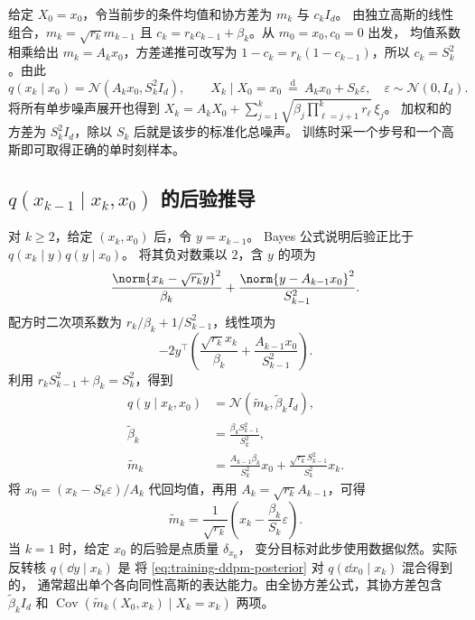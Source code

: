 给定 \(X_0=x_0\)，令当前步的条件均值和协方差为 \(m_k\) 与 \(c_kI_d\)。
由独立高斯的线性组合，\(m_k=\sqrt{r_k}m_{k-1}\) 且
\(c_k=r_k c_{k-1}+\beta_k\)。从 \(m_0=x_0,c_0=0\) 出发，
均值系数相乘给出 \(m_k=A_k x_0\)，方差递推可改写为
\(1-c_k=r_k(1-c_{k-1})\)，所以 \(c_k=S_k^2\)。由此
\begin{equation}
  q(x_k\mid x_0)=\mathcal N(A_kx_0,S_k^2I_d),\qquad
  X_k\mid X_0=x_0\ \overset{\mathrm d}{=}\ A_kx_0+S_k\varepsilon,
  \quad \varepsilon\sim\mathcal N(0,I_d).
  \label{eq:training-ddpm-marginal}
\end{equation}
将所有单步噪声展开也得到
\(X_k=A_k X_0+\sum_{j=1}^k\sqrt{\beta_j\prod_{\ell=j+1}^k r_\ell}\,\xi_j\)。
加权和的方差为 \(S_k^2I_d\)，除以 \(S_k\) 后就是该步的标准化总噪声。
训练时采一个步号和一个高斯即可取得正确的单时刻样本。

\subsection{\texorpdfstring{\(q(x_{k-1}\mid x_k,x_0)\)}{q(x\_(k-1) | x\_k,x\_0)} 的后验推导\requiredderivation}
\label{subsec:training-ddpm-posterior}

对 \(k\ge 2\)，给定 \((x_k,x_0)\) 后，令 \(y=x_{k-1}\)。
Bayes 公式说明后验正比于 \(q(x_k\mid y)q(y\mid x_0)\)。
将其负对数乘以 \(2\)，含 \(y\) 的项为
\[
  \frac{\norm{x_k-\sqrt{r_k}y}^2}{\beta_k}
  +\frac{\norm{y-A_{k-1} x_0}^2}{S_{k-1}^2}.
\]
配方时二次项系数为 \(r_k/\beta_k+1/S_{k-1}^2\)，线性项为
\[
  -2y^\top\left(\frac{\sqrt{r_k}x_k}{\beta_k}
                      +\frac{A_{k-1}x_0}{S_{k-1}^2}\right).
\]
利用 \(r_k S_{k-1}^2+\beta_k=S_k^2\)，得到
\begin{equation}
  \begin{aligned}
  q(y\mid x_k,x_0)&=\mathcal N(\widetilde m_k,\widetilde\beta_k I_d),\\
  \widetilde\beta_k&=\frac{\beta_k S_{k-1}^2}{S_k^2},\\
  \widetilde m_k&=\frac{A_{k-1}\beta_k}{S_k^2}x_0
      +\frac{\sqrt{r_k} S_{k-1}^2}{S_k^2}x_k .
  \end{aligned}
  \label{eq:training-ddpm-posterior}
\end{equation}
将 \(x_0=(x_k-S_k\varepsilon)/A_k\) 代回均值，再用 \(A_k=\sqrt{r_k}A_{k-1}\)，可得
\begin{equation}
  \widetilde m_k=\frac{1}{\sqrt{r_k}}
                \left(x_k-\frac{\beta_k}{S_k}\varepsilon\right).
  \label{eq:training-ddpm-eps-mean}
\end{equation}
当 \(k=1\) 时，给定 \(x_0\) 的后验是点质量 \(\delta_{x_0}\)，
变分目标对此步使用数据似然。实际反转核 \(q(\dd y\mid x_k)\) 是
将 \eqref{eq:training-ddpm-posterior} 对 \(q(\dd x_0\mid x_k)\) 混合得到的，
通常超出单个各向同性高斯的表达能力。由全协方差公式，其协方差包含
\(\widetilde\beta_k I_d\) 和
\(\operatorname{Cov}(\widetilde m_k(X_0,x_k)\mid X_k=x_k)\) 两项。

